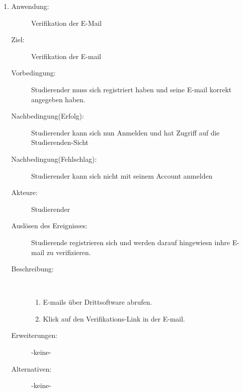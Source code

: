 \documentclass[parskip=full]{scrartcl}
\newcommand{\swtLabel}[1]{\textbf{\textbackslash #1\arabic*0\textbackslash}}
\begin{document}
\begin{enumerate}[label=\swtLabel{S}]
  \item
    \begin{description}
    \item[Anwendung:] Verifikation der E-Mail
    \item[Ziel:] Verifikation der E-mail
    \item[Vorbedingung:] Studierender muss sich registriert haben und seine
    E-mail korrekt angegeben haben.
    \item[Nachbedingung(Erfolg):] Studierender kann sich nun Anmelden und hat
    Zugriff auf die Studierenden-Sicht
    \item[Nachbedingung(Fehlschlag):] Studierender kann sich nicht mit seinem
    Account anmelden
    \item[Akteure:] Studierender
    \item[Auslösen des Ereignisses:] Studierende registrieren sich und werden
    darauf hingewiesn inhre E-mail zu verifizieren.
    \item[Beschreibung:]~
    \begin{enumerate}
      \item E-mails über Drittsoftware abrufen.
      \item Klick auf den Verifikations-Link in der E-mail.      
    \end{enumerate}
    \item[Erweiterungen:] -keine-
    \item[Alternativen:] -keine-
      \end{description}
  

\end{enumerate}
\end{document}
